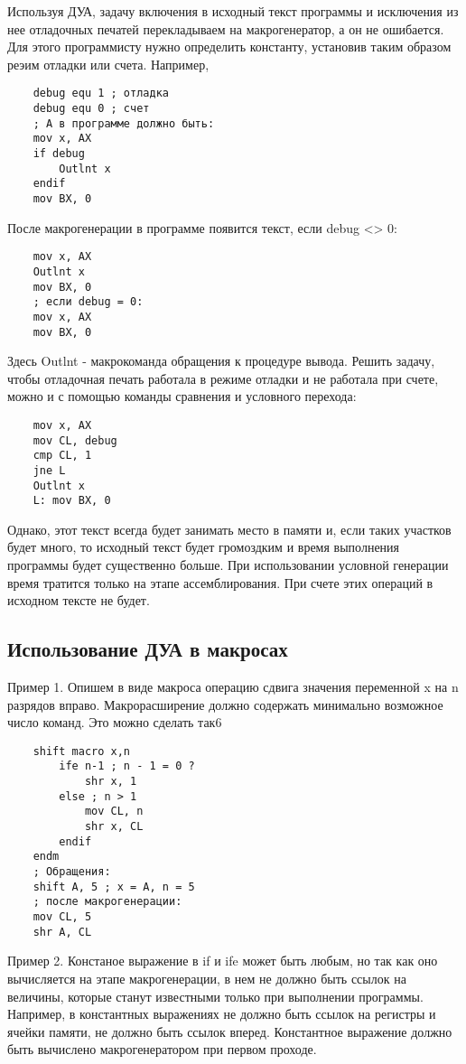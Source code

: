 Используя ДУА, задачу включения в исходный текст программы и исключения из нее отладочных печатей перекладываем на макрогенератор, а он не ошибается. Для этого программисту нужно определить константу, установив таким образом реэим отладки или счета. Например,
\begin{verbatim}
    debug equ 1 ; отладка
    debug equ 0 ; счет
    ; А в программе должно быть:
    mov x, AX
    if debug
        Outlnt x
    endif
    mov BX, 0
\end{verbatim}

После макрогенерации в программе появится текст, если debug <> 0:
\begin{verbatim}
    mov x, AX
    Outlnt x
    mov BX, 0
    ; если debug = 0:
    mov x, AX
    mov BX, 0
\end{verbatim}

Здесь Outlnt - макрокоманда обращения к процедуре вывода. Решить задачу, чтобы отладочная печать работала в режиме отладки и не работала при счете, можно и с помощью команды сравнения и условного перехода:
\begin{verbatim}
    mov x, AX
    mov CL, debug
    cmp CL, 1
    jne L
    Outlnt x
    L: mov BX, 0
\end{verbatim}

Однако, этот текст всегда будет занимать место в памяти и, если таких участков будет много, то исходный текст будет громоздким и время выполнения программы будет существенно больше. При использовании условной генерации время тратится только на этапе ассемблирования. При счете этих операций в исходном тексте не будет.

\subsection{Использование ДУА в макросах}

Пример 1. Опишем в виде макроса операцию сдвига значения переменной x на n разрядов вправо. Макрорасширение должно содержать минимально возможное число команд. Это можно сделать так6
\begin{verbatim}
    shift macro x,n
        ife n-1 ; n - 1 = 0 ?
            shr x, 1
        else ; n > 1
            mov CL, n
            shr x, CL
        endif
    endm
    ; Обращения:
    shift A, 5 ; x = A, n = 5
    ; после макрогенерации:
    mov CL, 5
    shr A, CL
\end{verbatim}

Пример 2. Констаное выражение в if и ife может быть любым, но так как оно вычисляется на этапе макрогенерации, в нем не должно быть ссылок на величины, которые станут известными только при выполнении программы. Например, в константных выражениях не должно быть ссылок на регистры и ячейки памяти, не должно быть ссылок вперед.
Константное выражение должно быть вычислено макрогенератором при первом проходе.

